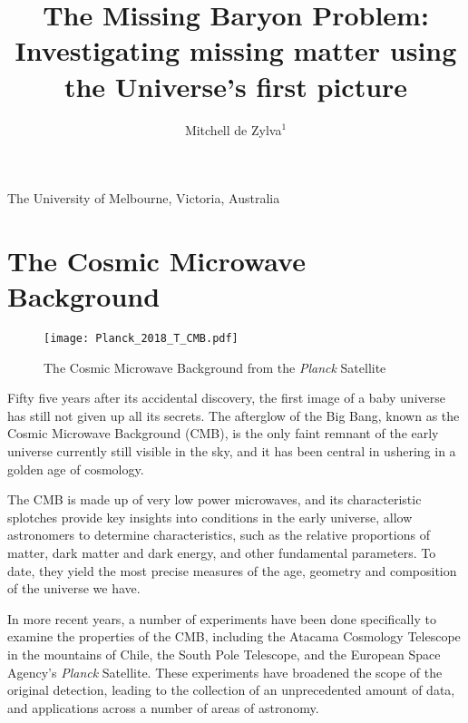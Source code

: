 \documentclass{nature}
\title{The Missing Baryon Problem: Investigating missing matter using the Universe's first picture}
\author{Mitchell de Zylva$^{1}$}
\begin{document}
\maketitle

\begin{affiliations}
 \item The University of Melbourne, Victoria, Australia
\end{affiliations}



\section{The Cosmic Microwave Background}
\begin{figure}[h]
    \label{fig:planck}
    \begin{center}
        \texttt{[image: Planck\_2018\_T\_CMB.pdf]}
        \caption{The Cosmic Microwave Background from the \textit{Planck} Satellite}
    \end{center}
\end{figure}

Fifty five years after its accidental discovery, the first image of a baby universe has still not given up all its secrets. The afterglow of the Big Bang, known as the Cosmic Microwave Background (CMB), is the only faint remnant of the early universe currently still visible in the sky, and it has been central in ushering in a golden age of cosmology.  

The CMB is made up of very low power microwaves, and its characteristic splotches provide key insights into conditions in the early universe, allow astronomers to determine characteristics, such as the relative proportions of matter, dark matter and dark energy, and other fundamental parameters. To date, they yield the most precise measures of the age, geometry and composition of the universe we have. 

In more recent years, a number of experiments have been done specifically to examine the properties of the CMB, including the Atacama Cosmology Telescope in the mountains of Chile, the South Pole Telescope, and the European Space Agency's \textit{Planck} Satellite. These experiments have broadened the scope of the original detection, leading to the collection of an unprecedented amount of data, and applications across a number of areas of astronomy. 
\end{document}

